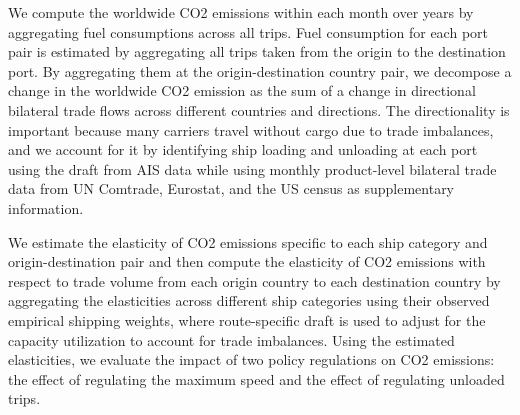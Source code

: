 \documentclass[hidelinks, 12pt,letterpaper]{article}
\begin{document}
We compute the worldwide CO2 emissions within each month over years by aggregating fuel consumptions across all trips. Fuel consumption for each port pair is estimated by aggregating all trips taken from the origin to the destination port. By aggregating them at the origin-destination country pair, we decompose a change in the worldwide CO2 emission as the sum of a change in directional bilateral trade flows across different countries and directions. The directionality is important because many carriers travel without cargo due to trade imbalances, and we account for it by identifying ship loading and unloading at each port using the draft from AIS data while using monthly product-level bilateral trade data from UN Comtrade, Eurostat, and the US census as supplementary information. 

We estimate the elasticity of CO2 emissions specific to each ship category and origin-destination pair and then compute the elasticity of CO2 emissions with respect to trade volume from each origin country to each destination country by aggregating the elasticities across different ship categories using their observed empirical shipping weights, where route-specific draft is used to adjust for the capacity utilization to account for trade imbalances. Using the estimated elasticities, we evaluate the impact of two policy regulations on CO2 emissions: the effect of regulating the maximum speed and the effect of regulating unloaded trips.






 
 

 
\end{document}

